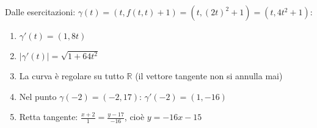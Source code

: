 \begin{esempio}
Dalle esercitazioni: $\gamma(t) = (t, f(t,t) + 1) = (t, (2t)^2 + 1) = (t, 4t^2 + 1)$:

\begin{enumerate}
    \item $\gamma'(t) = (1, 8t)$
    \item $|\gamma'(t)| = \sqrt{1 + 64t^2}$
    \item La curva è regolare su tutto $\mathbb{R}$ (il vettore tangente non si annulla mai)
    \item Nel punto $\gamma(-2) = (-2, 17)$: $\gamma'(-2) = (1, -16)$
    \item Retta tangente: $\frac{x+2}{1} = \frac{y-17}{-16}$, cioè $y = -16x - 15$
\end{enumerate}
\end{esempio}
